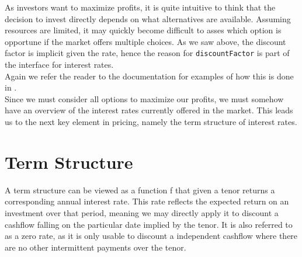 As investors want to maximize profits, it is quite intuitive to think that
the decision to invest directly depends on what alternatives are available.
Assuming resources are limited, it may quickly become difficult to asses which
option is opportune if the market offers multiple choices. As we saw above,
the discount factor is implicit given the rate, hence the reason for
\texttt{discountFactor} is part of the interface for interest rates.\\
Again we refer the reader to the documentation for examples of
how this is done in \hql.\\

Since we must consider all options to maximize our profits, we must somehow have an
overview of the interest rates currently offered in the market. This leads us to the
next key element in pricing, namely the term structure of interest rates.

\section{Term Structure}\label{sec:ts}

A term structure can be viewed as a function f that given a tenor returns 
a corresponding annual interest rate. This rate reflects the expected return 
on an investment over that period, meaning we may directly apply it to 
discount a cashflow falling on the particular date implied by the tenor.
It is also referred to as a zero rate, as it is only usable to discount 
a independent cashflow where there are no other intermittent payments over
the tenor.

